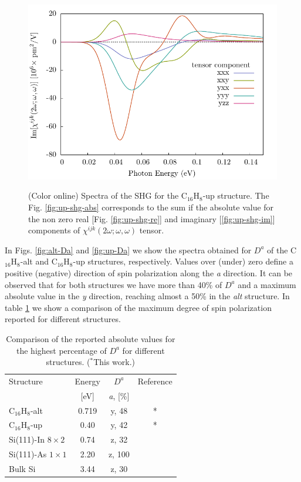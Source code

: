 \documentclass[aps,pra,11pt,tightenlines,showpacs,superscriptaddress,groupedaddress]{revtex4-1}
\newcommand{\lw}{0.55\linewidth}
\newcommand{\da}{$D^{a}$}
\newcommand{\altstc}{C$_{16}$H$_{8}$-alt}
\newcommand{\upstc}{C$_{16}$H$_{8}$-up}
\begin{document}
\begin{figure}
{            \includegraphics[width=\lw]{up/up_shg_final_im-sm}}
    \caption{(Color online) Spectra of the SHG for the {\upstc} structure. The Fig. \ref{fig:up-shg-abs} corresponds to the sum if the absolute value for the non zero real [Fig. \ref{fig:up-shg-re}] and imaginary [\ref{fig:up-shg-im}] components of $\chi^{ijk}(2\omega;\omega,\omega) $ tensor.}\label{fig:shg-up}
\end{figure}


In Figs. \ref{fig:alt-Da} and \ref{fig:up-Da} we show the spectra obtained for {\da} of the {\altstc} and {\upstc} structures, respectively. Values over (under) zero define a positive (negative) direction of spin polarization along the \emph{a} direction. It can be observed that for both structures we have more than 40\% of {\da} and a maximum absolute value in the \emph{y} direction, reaching almost a 50\% in the \emph{alt} structure. In table \ref{tab:dacomp} we show a comparison of the maximum degree of spin polarization reported for different structures.



\begin{table}[]
    \caption{Comparison of the reported absolute values for the highest percentage of {\da} for different structures. ($^{*}$This work.)}
    \label{tab:dacomp}
    \centering
    \begin{ruledtabular}
    \begin{tabular}{lccc}
    Structure & Energy & {\da} &  Reference\\
              & [eV]   & \emph{a}, [\%] \\
    \hline
    {\altstc}               & 0.719 & y, 48 & *     \\
    {\upstc}                & 0.40  & y, 42 & *     \\
    Si(111)-In $8\times2$   & 0.74  & z, 32 & \cite{arzate2014optical}  \\
    Si(111)-As $1\times1$   & 2.20  & z, 100& \cite{mendoza2012optical} \\
    Bulk Si                 & 3.44  & z, 30 & \cite{nastos2007full}     \\
    \end{tabular}
    \end{ruledtabular}
\end{table}
\end{document}
